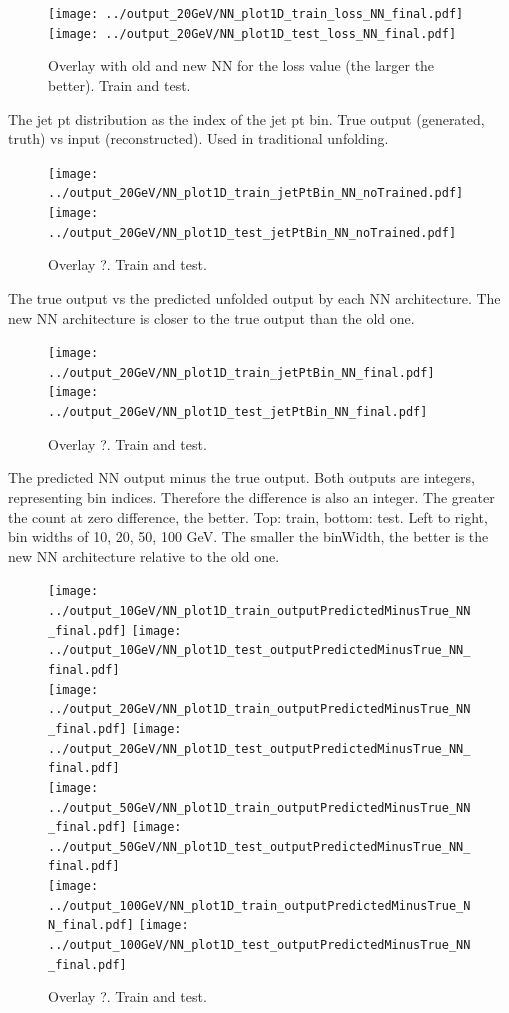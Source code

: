 \begin{figure}[h]
  \centering
  \texttt{[image: ../output\_20GeV/NN\_plot1D\_train\_loss\_NN\_final.pdf]}
  \texttt{[image: ../output\_20GeV/NN\_plot1D\_test\_loss\_NN\_final.pdf]}
  \caption{Overlay with old and new NN for the loss value (the larger the better). Train and test.}
  \label{fig:lossOldNew}
\end{figure}

The jet pt distribution as the index of the jet pt bin. True output (generated, truth) vs input (reconstructed). Used in traditional unfolding.

\begin{figure}[h]
  \centering
  \texttt{[image: ../output\_20GeV/NN\_plot1D\_train\_jetPtBin\_NN\_noTrained.pdf]}
  \texttt{[image: ../output\_20GeV/NN\_plot1D\_test\_jetPtBin\_NN\_noTrained.pdf]}
  \caption{Overlay ?. Train and test.}
  \label{fig:ptIndexNoTrained}
\end{figure}

The true output vs the predicted unfolded output by each NN architecture. The new NN architecture is closer to the true output than the old one.

\begin{figure}[h]
  \centering
  \texttt{[image: ../output\_20GeV/NN\_plot1D\_train\_jetPtBin\_NN\_final.pdf]}
  \texttt{[image: ../output\_20GeV/NN\_plot1D\_test\_jetPtBin\_NN\_final.pdf]}
  \caption{Overlay ?. Train and test.}
  \label{fig:ptIndexFinal}
\end{figure}

The predicted NN output minus the true output.  Both outputs are integers, representing bin indices. Therefore the difference is also an integer. The greater the count at zero difference, the better.  Top: train, bottom: test. Left to right, bin widths of 10, 20, 50, 100 GeV. The smaller the binWidth, the better is the new NN architecture relative to the old one.

\begin{figure}[h]
  \centering
  \texttt{[image: ../output\_10GeV/NN\_plot1D\_train\_outputPredictedMinusTrue\_NN\_final.pdf]}
  \texttt{[image: ../output\_10GeV/NN\_plot1D\_test\_outputPredictedMinusTrue\_NN\_final.pdf]}\\
  \texttt{[image: ../output\_20GeV/NN\_plot1D\_train\_outputPredictedMinusTrue\_NN\_final.pdf]}
  \texttt{[image: ../output\_20GeV/NN\_plot1D\_test\_outputPredictedMinusTrue\_NN\_final.pdf]}\\
  \texttt{[image: ../output\_50GeV/NN\_plot1D\_train\_outputPredictedMinusTrue\_NN\_final.pdf]}
  \texttt{[image: ../output\_50GeV/NN\_plot1D\_test\_outputPredictedMinusTrue\_NN\_final.pdf]}\\
  \texttt{[image: ../output\_100GeV/NN\_plot1D\_train\_outputPredictedMinusTrue\_NN\_final.pdf]}
  \texttt{[image: ../output\_100GeV/NN\_plot1D\_test\_outputPredictedMinusTrue\_NN\_final.pdf]}\\
  \caption{Overlay ?. Train and test.}
  \label{fig:binIndexPredictedMinusTruel}
\end{figure}

